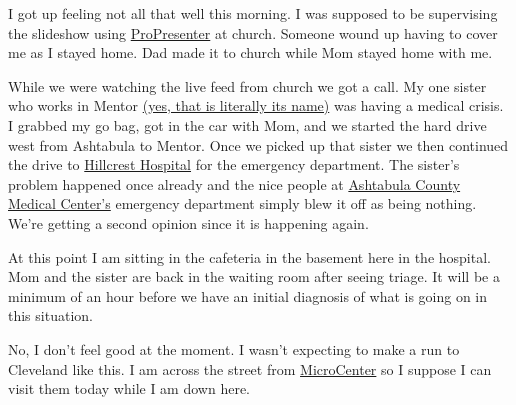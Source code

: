 I got up feeling not all that well this morning. I was supposed to be
supervising the slideshow using
\href{http://web.archive.org/web/20230127224925/https://renewedvision.com/propresenter/}{ProPresenter}
at church. Someone wound up having to cover me as I stayed home. Dad
made it to church while Mom stayed home with me.

While we were watching the live feed from church we got a call. My one
sister who works in Mentor
\href{https://en.wikipedia.org/w/index.php?title=Mentor,_Ohio&oldid=1130934184}{(yes,
that is literally its name)} was having a medical crisis. I grabbed my
go bag, got in the car with Mom, and we started the hard drive west from
Ashtabula to Mentor. Once we picked up that sister we then continued the
drive to
\href{https://my.clevelandclinic.org/locations/hillcrest-hospital}{Hillcrest
Hospital} for the emergency department. The sister's problem happened
once already and the nice people at
\href{https://www.acmchealth.org/}{Ashtabula County Medical Center's}
emergency department simply blew it off as being nothing. We're getting
a second opinion since it is happening again.

At this point I am sitting in the cafeteria in the basement here in the
hospital. Mom and the sister are back in the waiting room after seeing
triage. It will be a minimum of an hour before we have an initial
diagnosis of what is going on in this situation.

No, I don't feel good at the moment. I wasn't expecting to make a run to
Cleveland like this. I am across the street from
\href{https://www.microcenter.com/site/stores/mayfield-heights.aspx}{MicroCenter}
so I suppose I can visit them today while I am down here.
